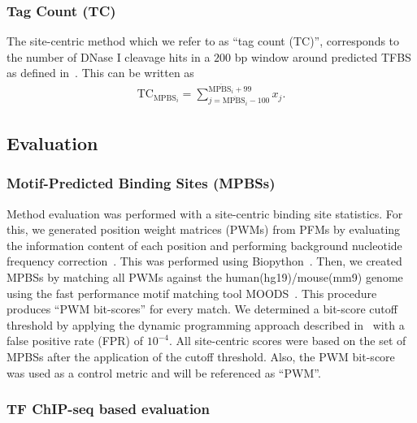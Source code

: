 \documentclass[11pt]{article}
\begin{document}
\subsubsection{Tag Count (TC)}
\label{sec:tc}

The site-centric method which we refer to as ``tag count (TC)'', corresponds to the number of DNase I cleavage hits in a $200$ bp window around predicted TFBS as defined in~\cite{he2014}. This can be written as
\begin{align}
\text{TC}_{\text{MPBS}_{i}} = \sum_{j=\overline{\text{MPBS}_{i}}-100}^{\overline{\text{MPBS}_{i}}+99} {x}_{j}.
\label{eq:tc}
\end{align}

\subsection{Evaluation}
\label{sec:evaluation}

\subsubsection{Motif-Predicted Binding Sites (MPBSs)}
\label{sec:mpbs}

Method evaluation was performed with a site-centric binding site statistics. For this, we generated position weight matrices (PWMs) from PFMs by evaluating the information content of each position and performing background nucleotide frequency correction~\citep{stormo2000}. This was performed using Biopython~\citep{cock2009}. Then, we created MPBSs by matching all PWMs against the human(hg19)/mouse(mm9) genome using the fast performance motif matching tool MOODS~\citep{korhonen2009}. This procedure produces ``PWM bit-scores'' for every match. We determined a bit-score cutoff threshold by applying the dynamic programming approach described in~\cite{wilczynski2009} with a false positive rate (FPR) of $10^{-4}$. All site-centric scores were based on the set of MPBSs after the application of the cutoff threshold. Also, the PWM bit-score was used as a control metric and will be referenced as ``PWM''.

\subsubsection{TF ChIP-seq based evaluation}
\label{sec:performeval}
\end{document}
